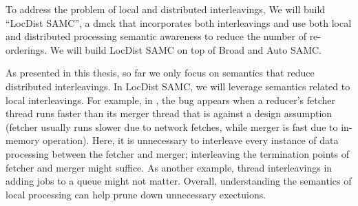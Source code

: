 To address the problem of local and distributed interleavings, We will build
``LocDist SAMC'', a dmck that incorporates both interleavings and use both local
and distributed processing semantic awareness to reduce the number of
re-orderings. We will build LocDist SAMC on top of Broad and Auto SAMC. 

As presented in this thesis, so far we only focus on semantics that reduce
distributed interleavings. In LocDist SAMC, we will leverage semantics related
to local interleavings. For example, in , the bug appears when a
reducer’s fetcher thread runs faster than its merger thread that is against a
design assumption (fetcher usually runs slower due to network fetches, while
merger is fast due to in-memory operation). Here, it is unnecessary to
interleave every instance of data processing between the fetcher and merger;
interleaving the termination points of fetcher and merger might suffice. As
another example, thread interleavings in adding jobs to a queue might not
matter. Overall, understanding the semantics of local processing can help prune
down unnecessary exectuions.

